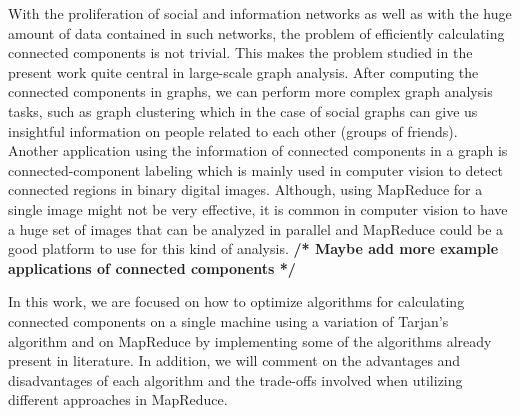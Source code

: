 With the proliferation of social and information networks as well as with the huge amount of data contained in such networks, the problem of efficiently calculating connected components is not trivial. This makes the problem studied in the present work quite central in large-scale graph analysis. After computing the connected components in graphs, we can perform more complex graph analysis tasks, such as graph clustering which in the case of social graphs can give us insightful information on people related to each other (\eg groups of friends). Another application using the information of connected components in a graph is connected-component labeling which is mainly used in computer vision to detect connected regions in binary digital images. Although, using MapReduce for a single image might not be very effective, it is common in computer vision to have a huge set of images that can be analyzed in parallel and MapReduce could be a good platform to use for this kind of analysis. \textbf{/* Maybe add more example applications of connected components */}

In this work, we are focused on how to optimize algorithms for calculating connected components on a single machine using a variation of Tarjan's algorithm and on MapReduce by implementing some of the algorithms already present in literature. In addition, we will comment on the advantages and disadvantages of each algorithm and the trade-offs involved when utilizing different approaches in MapReduce.

